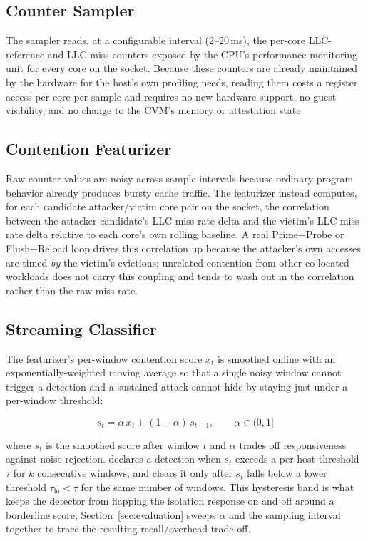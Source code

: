 \subsection{Counter Sampler}

The sampler reads, at a configurable interval (2--20\,ms), the per-core LLC-reference and
LLC-miss counters exposed by the CPU's performance monitoring unit for every core on the
socket. Because these counters are already maintained by the hardware for the host's own
profiling needs, reading them costs a register access per core per sample and requires no
new hardware support, no guest visibility, and no change to the CVM's memory or attestation
state.

\subsection{Contention Featurizer}

Raw counter values are noisy across sample intervals because ordinary program behavior
already produces bursty cache traffic. The featurizer instead computes, for each candidate
attacker/victim core pair on the socket, the correlation between the attacker candidate's
LLC-miss-rate delta and the victim's LLC-miss-rate delta relative to each core's own rolling
baseline. A real Prime+Probe or Flush+Reload loop drives this correlation up because the
attacker's own accesses are timed \emph{by} the victim's evictions; unrelated contention from
other co-located workloads does not carry this coupling and tends to wash out in the
correlation rather than the raw miss rate.

\subsection{Streaming Classifier}
\label{sec:classifier}

The featurizer's per-window contention score $x_t$ is smoothed online with an
exponentially-weighted moving average so that a single noisy window cannot trigger a
detection and a sustained attack cannot hide by staying just under a per-window threshold:

\begin{equation}
s_t = \alpha \, x_t + (1-\alpha)\, s_{t-1}, \qquad \alpha \in (0,1]
\label{eq:ewma}
\end{equation}

\noindent where $s_t$ is the smoothed score after window $t$ and $\alpha$ trades off
responsiveness against noise rejection. \sysname{} declares a detection when $s_t$ exceeds a
per-host threshold $\tau$ for $k$ consecutive windows, and clears it only after $s_t$ falls
below a lower threshold $\tau_{\text{lo}} < \tau$ for the same number of windows. This
hysteresis band is what keeps the detector from flapping the isolation response on and off
around a borderline score; Section~\ref{sec:evaluation} sweeps $\alpha$ and the sampling
interval together to trace the resulting recall/overhead trade-off.

